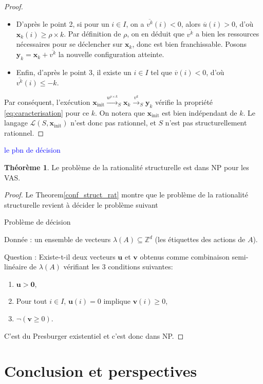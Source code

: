 \documentclass[a4paper,final]{article}
\theoremstyle{definition}
\newtheorem{Theorem}{Théorème}
\let\leq\leqslant
\let\geq\geqslant
\newcommand{\alain}[1]{\textcolor{blue}{#1}}
\newcommand{\Z}{\ensuremath{\mathbb{Z}}}
\newcommand{\lang}{\ensuremath{\mathcal{L}}}
\newcommand{\trans}[2]{\ensuremath{\stackrel{#1}{\longrightarrow}_{#2}}}
\newcommand{\vect}[1]{\ensuremath{\mathbf{#1}}}
\newcommand{\xinit}{\ensuremath{\vect{x}_\text{init}}}
\newcommand{\valeur}[1]{\ensuremath{\overline{#1}}}
\begin{document}
\begin{proof}
\begin{itemize}
    \item D'après le point 2, si pour un $i\in I$, on a $\valeur{v^k}(i) < 0$, alors $\valeur{u}(i) > 0$, d'où $\vect{x}_k(i) \geq \rho\times k$.
    Par définition de $\rho$, on en déduit que $\valeur{v^k}$ a bien les ressources nécessaires pour se déclencher sur $\vect{x}_k$, donc est bien franchissable.
    Posons $\vect{y}_k = \vect{x}_k + \valeur{v^k}$ la nouvelle configuration atteinte.
    
    \item Enfin, d'après le point 3, il existe un $i\in I$ tel que $\valeur{v}(i) < 0$, d'où $\valeur{v^k}(i) \leq -k$.
\end{itemize}
Par conséquent, l'exécution $\xinit \trans{u^{\rho\times k}}{S} \vect{x}_k \trans{v^k}{S} \vect{y}_k$ vérifie la propriété \eqref{eq:caracterisation} pour ce $k$.
On notera que $\xinit$ est bien indépendant de $k$.
Le langage $\lang(S,\xinit)$ n'est donc pas rationnel, et $S$ n'est pas structurellement rationnel.
\end{proof}

\alain{le pbn de décision}

\begin{Theorem}\label{NP conf_struct_rat}
Le  problème de la rationalité structurelle est dans NP pour les VAS.
\end{Theorem}

\begin{proof}
Le Theorem\ref{conf_struct_rat} montre que le problème de la rationalité structurelle revient à décider le problème suivant

Problème de décision

Donnée : un ensemble de vecteurs $\lambda(A) \subseteq \Z^d$ (les étiquettes des actions de $A$).

Question : Existe-t-il deux vecteurs $\vect{u}$ et $\vect{v}$ obtenus comme combinaison semi-linéaire de $\lambda(A)$ vérifiant les 3 conditions suivantes:
\begin{enumerate}
    \item $\vect{u} > \vect{0}$,
    \item Pour tout $i \in I$, $\vect{u}(i)=0$ implique $\vect{v}(i) \geq 0$,
    \item  $\lnot(\vect{v} \geq 0)$.
\end{enumerate}
C'est du Presburger existentiel et c'est donc dans NP.
\end{proof}


\section{Conclusion et perspectives}
\end{document}
